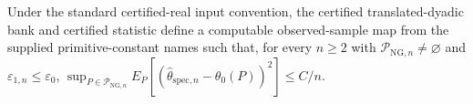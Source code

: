 Under the standard certified-real input convention, the certified translated-dyadic bank and certified statistic define a computable observed-sample map from the supplied primitive-constant names such that, for every \(n\ge2\) with \(\mathcal P_{\mathrm{NG},n}\neq\varnothing\) and \(\varepsilon_{1,n}\le\varepsilon_0\), \(\sup_{P\in\mathcal P_{\mathrm{NG},n}}E_P[(\widehat\theta_{\mathrm{spec},n}-\theta_0(P))^2]\le C/n\).